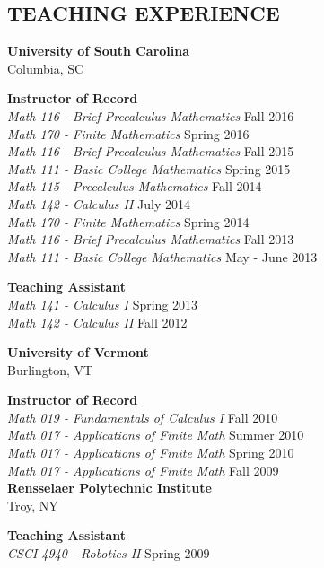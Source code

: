 \documentclass[line,overlapped]{res}
\begin{document}
\begin{resume}
 \section{TEACHING EXPERIENCE}
         {\bf University of South Carolina}\\Columbia, SC
         
         {\bf Instructor of Record}\\
         {\sl Math 116 - Brief Precalculus Mathematics} \hfill Fall 2016\\
         {\sl Math 170 - Finite Mathematics} \hfill Spring 2016\\
         {\sl Math 116 - Brief Precalculus Mathematics} \hfill Fall 2015\\
         {\sl Math 111 - Basic College Mathematics} \hfill Spring 2015\\
         {\sl Math 115 - Precalculus Mathematics} \hfill Fall 2014\\
         {\sl Math 142 - Calculus II} \hfill July 2014\\
         {\sl Math 170 - Finite Mathematics} \hfill Spring 2014\\
         {\sl Math 116 - Brief Precalculus Mathematics} \hfill Fall 2013\\
         {\sl Math 111 - Basic College Mathematics} \hfill May - June 2013

         {\bf Teaching Assistant}\\
         {\sl Math 141 - Calculus I} \hfill Spring 2013\\
         {\sl Math 142 - Calculus II} \hfill Fall 2012

         {\bf University of Vermont}\\Burlington, VT
         
         {\bf Instructor of Record}\\
         {\sl Math 019 - Fundamentals of Calculus I} \hfill Fall 2010\\
         {\sl Math 017 - Applications of Finite Math} \hfill Summer 2010\\
         {\sl Math 017 - Applications of Finite Math} \hfill Spring 2010\\
         {\sl Math 017 - Applications of Finite Math} \hfill Fall 2009\\
         
         {\bf Rensselaer Polytechnic Institute}\\Troy, NY

         {\bf Teaching Assistant}\\
         {\sl CSCI 4940 - Robotics II} \hfill Spring 2009\\


\end{resume}
\end{document}
